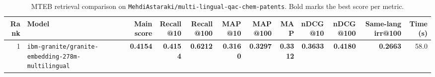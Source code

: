 \begin{table}[t]
\centering
\small
\begin{tabular}{r l r r r r r r r r r r}
\hline
Rank & Model & Main score & Recall@10 & Recall@100 & MAP@10 & MAP@100 & MAP & nDCG@10 & nDCG@100 & Same-lang irr@100 & Time (s) \\
\hline
1 & \texttt{ibm-granite/granite-embedding-278m-multilingual} & \textbf{0.4154} & \textbf{0.4154} & \textbf{0.6212} & \textbf{0.3160} & \textbf{0.3297} & \textbf{0.3312} & \textbf{0.3633} & \textbf{0.4180} & \textbf{0.2663} & 58.0 \\
\hline
\end{tabular}
\caption{MTEB retrieval comparison on \texttt{MehdiAstaraki/multi-lingual-qac-chem-patents}. Bold marks the best score per metric.}
\label{tab:mteb-model-comparison}
\end{table}
